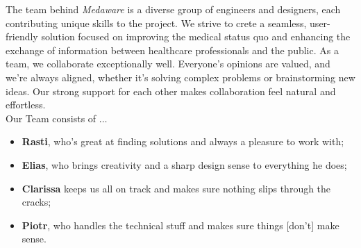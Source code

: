 The team behind \textit{Medaware} is a diverse group of engineers and designers, each contributing unique skills to the project.
We strive to crete a seamless, user-friendly solution focused on improving the medical status quo and enhancing the exchange of
information between healthcare professionals and the public. As a team, we collaborate exceptionally well. Everyone's
opinions are valued, and we're always aligned, whether it's solving complex problems or brainstorming new ideas.
Our strong support for each other makes collaboration feel natural and effortless.\\[2\baselineskip]
Our Team consists of $\dots$ \\
\begin{itemize}
	\renewcommand{\labelitemi}{}
	\item \textbf{Rasti}, who's great at finding solutions and always a pleasure to work with;
	\item \textbf{Elias}, who brings creativity and a sharp design sense to everything he does;
	\item \textbf{Clarissa} keeps us all on track and makes sure nothing slips through the cracks;
	\item \textbf{Piotr}, who handles the technical stuff and makes sure things [don't] make sense.
\end{itemize}
\vspace{\baselineskip}
